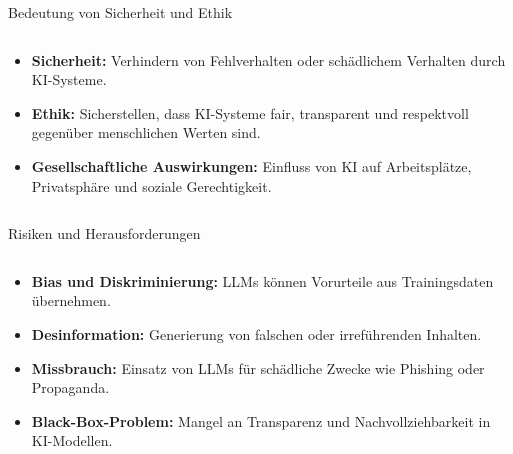 \documentclass[aspectratio=1610, xcolor=dvipsnames, 9pt]{beamer}
\begin{document}
\begin{frame}{Bedeutung von Sicherheit und Ethik}
  \begin{columns}
    \begin{column}{1\textwidth}
      \begin{itemize}
        \item \textbf{Sicherheit:} Verhindern von Fehlverhalten oder schädlichem Verhalten durch KI-Systeme.
        \item \textbf{Ethik:} Sicherstellen, dass KI-Systeme fair, transparent und respektvoll gegenüber menschlichen Werten sind.
        \item \textbf{Gesellschaftliche Auswirkungen:} Einfluss von KI auf Arbeitsplätze, Privatsphäre und soziale Gerechtigkeit.
      \end{itemize}
    \end{column}
  \end{columns}
\end{frame}

\begin{frame}{Risiken und Herausforderungen}
  \begin{columns}
    \begin{column}{1\textwidth}
      \begin{itemize}
        \item \textbf{Bias und Diskriminierung:} LLMs können Vorurteile aus Trainingsdaten übernehmen.
        \item \textbf{Desinformation:} Generierung von falschen oder irreführenden Inhalten.
        \item \textbf{Missbrauch:} Einsatz von LLMs für schädliche Zwecke wie Phishing oder Propaganda.
        \item \textbf{Black-Box-Problem:} Mangel an Transparenz und Nachvollziehbarkeit in KI-Modellen.
      \end{itemize}
    \end{column}
  \end{columns}
\end{frame}
\end{document}
